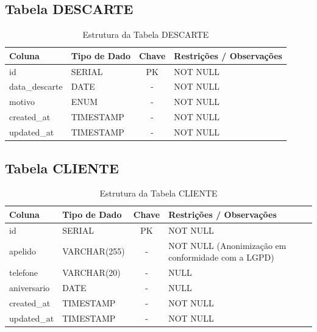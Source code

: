 \documentclass[
	12pt,				%
	openany,			%
	oneside,			%
	a4paper,			%
	english,			%
	french,				%
	spanish,			%
	brazil				%
	]{abntex2}
\begin{document}
\begin{apendicesenv}
\subsection{Tabela DESCARTE}
\begin{table}[H]
\centering
\caption{Estrutura da Tabela DESCARTE}
\begin{tabular}{|l|p{4cm}|c|p{6cm}|}
\hline
\textbf{Coluna} & \textbf{Tipo de Dado} & \textbf{Chave} & \textbf{Restrições / Observações} \\ \hline
id & SERIAL & PK & NOT NULL \\ \hline
data\_descarte & DATE & - & NOT NULL \\ \hline
motivo & ENUM & - & NOT NULL \\ \hline
created\_at & TIMESTAMP & - & NOT NULL \\ \hline
updated\_at & TIMESTAMP & - & NOT NULL \\ \hline
\end{tabular}
\end{table}

\subsection{Tabela CLIENTE}
\begin{table}[H]
\centering
\caption{Estrutura da Tabela CLIENTE}
\begin{tabular}{|l|p{4cm}|c|p{6cm}|}
\hline
\textbf{Coluna} & \textbf{Tipo de Dado} & \textbf{Chave} & \textbf{Restrições / Observações} \\ \hline
id & SERIAL & PK & NOT NULL \\ \hline
apelido & VARCHAR(255) & - & NOT NULL (Anonimização em conformidade com a LGPD) \\ \hline
telefone & VARCHAR(20) & - & NULL \\ \hline
aniversario & DATE & - & NULL \\ \hline
created\_at & TIMESTAMP & - & NOT NULL \\ \hline
updated\_at & TIMESTAMP & - & NOT NULL \\ \hline
\end{tabular}
\end{table}


\end{apendicesenv}
\end{document}
